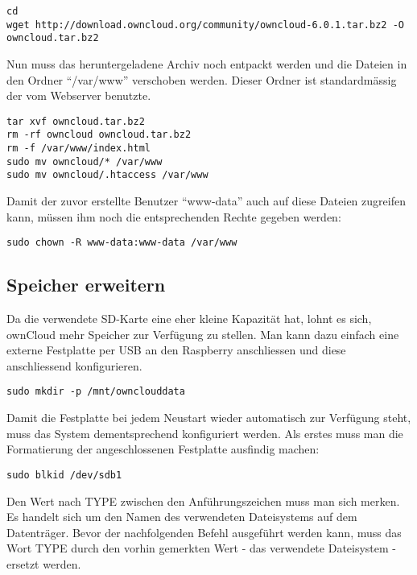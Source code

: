 \begin{lstlisting}
cd
wget http://download.owncloud.org/community/owncloud-6.0.1.tar.bz2 -O owncloud.tar.bz2
\end{lstlisting}

Nun muss das heruntergeladene Archiv noch entpackt werden und die Dateien in den Ordner ``/var/www'' verschoben werden. Dieser Ordner ist standardmässig der vom Webserver benutzte.

\begin{lstlisting}
tar xvf owncloud.tar.bz2
rm -rf owncloud owncloud.tar.bz2
rm -f /var/www/index.html
sudo mv owncloud/* /var/www
sudo mv owncloud/.htaccess /var/www
\end{lstlisting}

Damit der zuvor erstellte Benutzer ``www-data'' auch auf diese Dateien zugreifen kann, müssen ihm noch die entsprechenden Rechte gegeben werden:

\begin{lstlisting}
sudo chown -R www-data:www-data /var/www
\end{lstlisting}

\subsection{Speicher erweitern}
Da die verwendete SD-Karte eine eher kleine Kapazität hat, lohnt es sich, ownCloud mehr Speicher zur Verfügung zu stellen. Man kann dazu einfach eine externe Festplatte per USB an den Raspberry anschliessen
und diese anschliessend konfigurieren.

\begin{lstlisting}
sudo mkdir -p /mnt/ownclouddata
\end{lstlisting}
Damit die Festplatte bei jedem Neustart wieder automatisch zur Verfügung steht, muss das System dementsprechend konfiguriert werden. Als erstes muss man die Formatierung der angeschlossenen Festplatte ausfindig machen:

\begin{lstlisting}
sudo blkid /dev/sdb1
\end{lstlisting}

Den Wert nach TYPE zwischen den Anführungszeichen muss man sich merken. Es handelt sich um den Namen des verwendeten Dateisystems auf dem Datenträger.
Bevor der nachfolgenden Befehl ausgeführt werden kann, muss das Wort TYPE durch den vorhin gemerkten Wert - das verwendete Dateisystem - ersetzt werden.

